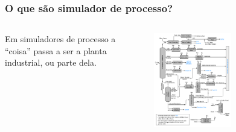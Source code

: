 \documentclass[aspectratio=169]{beamer}
\begin{document}
\begin{frame}
	\frametitle{O que são simulador de processo?}
	\begin{columns}[c] 
		Em simuladores de processo a ``coisa'' passa a ser a planta industrial, ou
		parte dela.
		\begin{center}
			\includegraphics[width=0.5\textwidth]
				{img/RefineryFlow.png}
		\end{center}
	\end{columns}
\end{frame}
\end{document}
